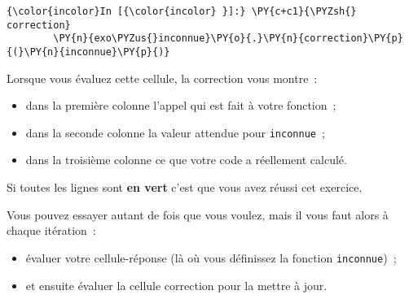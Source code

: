     \begin{Verbatim}[commandchars=\\\{\}]
{\color{incolor}In [{\color{incolor} }]:} \PY{c+c1}{\PYZsh{} correction}
        \PY{n}{exo\PYZus{}inconnue}\PY{o}{.}\PY{n}{correction}\PY{p}{(}\PY{n}{inconnue}\PY{p}{)}
\end{Verbatim}


    Lorsque vous évaluez cette cellule, la correction vous montre~:

\begin{itemize}
\tightlist
\item
  dans la première colonne l'appel qui est fait à votre fonction~;
\item
  dans la seconde colonne la valeur attendue pour \texttt{inconnue}~;
\item
  dans la troisième colonne ce que votre code a réellement calculé.
\end{itemize}

Si toutes les lignes sont \textbf{en vert} c'est que vous avez réussi
cet exercice.

    Vous pouvez essayer autant de fois que vous voulez, mais il vous faut
alors à chaque itération~:

\begin{itemize}
\tightlist
\item
  évaluer votre cellule-réponse (là où vous définissez la fonction
  \texttt{inconnue})~;
\item
  et ensuite évaluer la cellule correction pour la mettre à jour.
\end{itemize}